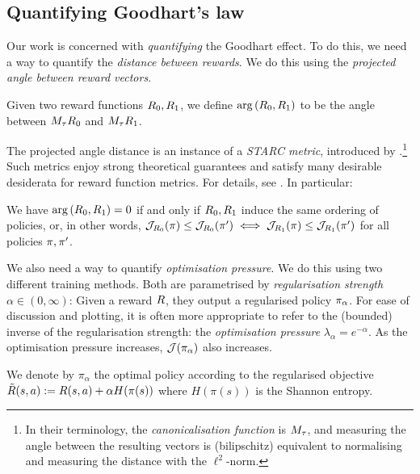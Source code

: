 \subsection{Quantifying Goodhart's law}

Our work is concerned with \emph{quantifying} the Goodhart effect. To do this, we need a way to quantify the \emph{distance between rewards}. We do this using the \emph{projected angle between reward vectors}.

\begin{definition}\label{def:angle-distance}
    Given two reward functions $R_0, R_1$, we define $\mathrm{arg}\left({R_0}, {R_1}\right)$ to be the angle between $M_\tau R_0$ and $M_\tau R_1$.
\end{definition}

The projected angle distance is an instance of a \emph{STARC metric}, introduced by \citet{skalse2023starc}.\footnote{In their terminology, the \emph{canonicalisation function} is $M_\tau$, and measuring the angle between the resulting vectors is (bilipschitz) equivalent to normalising and measuring the distance with the $\ell^2$-norm.} Such metrics enjoy strong theoretical guarantees and satisfy many desirable desiderata for reward function metrics. For details, see \citet{skalse2023starc}. In particular:

\begin{proposition}
We have $\mathrm{arg}\left({R_0}, {R_1}\right) = 0$ if and only if $R_0, R_1$ induce the same ordering of policies, or, in other words, $\mathcal{J}_{R_0}(\pi) \leq \mathcal{J}_{R_0}(\pi') \iff \mathcal{J}_{R_1}(\pi) \leq \mathcal{J}_{R_1}(\pi')$ for all policies $\pi, \pi'$.
\end{proposition}

We also need a way to quantify \emph{optimisation pressure}. We do this using two different training methods. Both are parametrised by \emph{regularisation strength} $\alpha \in (0, \infty)$: Given a reward $R$, they output a regularised policy $\pi_\alpha$. 
For ease of discussion and plotting, it is often more appropriate to refer to the (bounded) inverse of the regularisation strength: the \emph{optimisation pressure} $\lambda_\alpha = e^{-\alpha}$. As the optimisation pressure increases, $\mathcal{J}(\pi_\alpha)$ also increases.

\begin{definition}\label{def:mce}
    We denote by $\pi_{\alpha}$ the optimal policy according to the regularised objective $\tilde{R}(s, a) := R(s, a) +\alpha H(\pi(s))$ where $H(\pi(s))$ is the Shannon entropy.
\end{definition}

